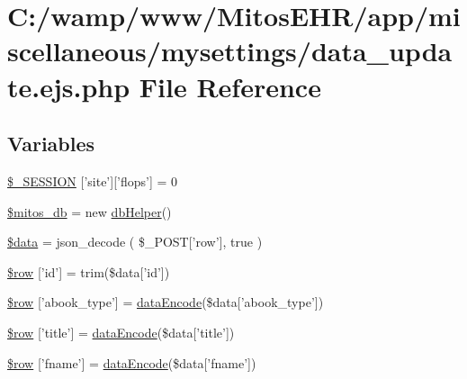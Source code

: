 \hypertarget{miscellaneous_2mysettings_2data__update_8ejs_8php}{\section{\-C\-:/wamp/www/\-Mitos\-E\-H\-R/app/miscellaneous/mysettings/data\-\_\-update.ejs.\-php \-File \-Reference}
\label{miscellaneous_2mysettings_2data__update_8ejs_8php}
}
\subsection*{\-Variables}
\begin{DoxyCompactItemize}
\item 
\hyperlink{miscellaneous_2mysettings_2data__update_8ejs_8php_a99fda8552a3e58235643b79f5af3ded8}{\$\-\_\-\-S\-E\-S\-S\-I\-O\-N} \mbox{[}'site'\mbox{]}\mbox{[}'flops'\mbox{]} = 0
\item 
\hyperlink{miscellaneous_2mysettings_2data__update_8ejs_8php_ab5d961f93efe4e2e8d8374f01dd6c65a}{\$mitos\-\_\-db} = new \hyperlink{classdb_helper}{db\-Helper}()
\item 
\hyperlink{miscellaneous_2mysettings_2data__update_8ejs_8php_a6efc15b5a2314dd4b5aaa556a375c6d6}{\$data} = json\-\_\-decode ( \$\-\_\-\-P\-O\-S\-T\mbox{[}'row'\mbox{]}, true )
\item 
\hyperlink{miscellaneous_2mysettings_2data__update_8ejs_8php_a4d5e7bc8bd41ef1d4dbfdb851ced695a}{\$row} \mbox{[}'id'\mbox{]} = trim(\$data\mbox{[}'id'\mbox{]})
\item 
\hyperlink{miscellaneous_2mysettings_2data__update_8ejs_8php_a0d1b6e8abe038ac8d97ac3bcaffc1aec}{\$row} \mbox{[}'abook\-\_\-type'\mbox{]} = \hyperlink{data_exchange_8class_8php_a18220e6e744fcb46d788ed8b03b85f62}{data\-Encode}(\$data\mbox{[}'abook\-\_\-type'\mbox{]})
\item 
\hyperlink{miscellaneous_2mysettings_2data__update_8ejs_8php_a70d36cba6a35524466f2a4c8112c8e4e}{\$row} \mbox{[}'title'\mbox{]} = \hyperlink{data_exchange_8class_8php_a18220e6e744fcb46d788ed8b03b85f62}{data\-Encode}(\$data\mbox{[}'title'\mbox{]})
\item 
\hyperlink{miscellaneous_2mysettings_2data__update_8ejs_8php_a5e241e1f48972b6bd961b356bd5b0b66}{\$row} \mbox{[}'fname'\mbox{]} = \hyperlink{data_exchange_8class_8php_a18220e6e744fcb46d788ed8b03b85f62}{data\-Encode}(\$data\mbox{[}'fname'\mbox{]})

\end{DoxyCompactItemize}
